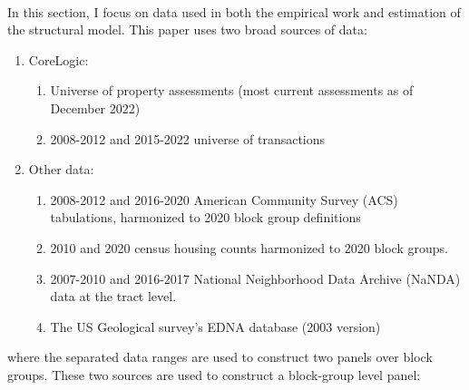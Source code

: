 \documentclass[12pt]{article}
\begin{document}
	\paragraph*{}
 In this section, I focus on data used in both the empirical work and estimation of the structural model. This paper uses two broad sources of data: 
	
	\begin{enumerate}
		\item CoreLogic:
		
		\begin{enumerate}
			\item Universe of property assessments (most current assessments as of December 2022) 
			
			\item 2008-2012 and 2015-2022 universe of transactions
		\end{enumerate} 
		
		\item Other data:
		\begin{enumerate}
			\item 2008-2012 and 2016-2020 American Community Survey (ACS) tabulations, harmonized to 2020 block group definitions
			
			\item 2010 and 2020 census housing counts harmonized to 2020 block groups.
			
			\item 2007-2010 and 2016-2017 National Neighborhood Data Archive (NaNDA) data at the tract level. 
			
			\item The US Geological survey's EDNA database (2003 version)
		\end{enumerate}
	\end{enumerate} 
	where the separated data ranges are used to construct two panels over block groups. These two sources are used to construct a block-group level panel:
	
\end{document}
